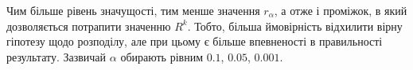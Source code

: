 Чим більше рівень значущості, тим менше значення $r_{\alpha}$, а отже і
проміжок, в який дозволяється потрапити значенню $R^k$.
Тобто, більша ймовірність відхилити вірну гіпотезу щодо розподілу,
але при цьому є більше впевненості в правильності результату.
Зазвичай $\alpha$ обирають рівним $0.1$, $0.05$, $0.001$.
